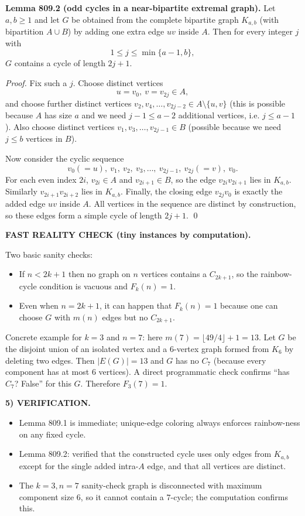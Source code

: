\textbf{Lemma 809.2 (odd cycles in a near-bipartite extremal graph).}
Let $a,b\ge 1$ and let $G$ be obtained from the complete bipartite graph $K_{a,b}$ (with bipartition $A\cup B$) by adding one extra edge $uv$ inside $A$.
Then for every integer $j$ with
\[
1\le j\le \min\{a-1,b\},
\]
$G$ contains a cycle of length $2j+1$.

\emph{Proof.}
Fix such a $j$. Choose distinct vertices
\[
 u=v_0,\ v=v_{2j}\in A,
\]
and choose further distinct vertices $v_2,v_4,\dots,v_{2j-2}\in A\setminus\{u,v\}$ (this is possible because $A$ has size $a$ and we need $j-1\le a-2$ additional vertices, i.e. $j\le a-1$).
Also choose distinct vertices $v_1,v_3,\dots,v_{2j-1}\in B$ (possible because we need $j\le b$ vertices in $B$).

Now consider the cyclic sequence
\[
 v_0(=u),\ v_1,\ v_2,\ v_3,\dots,\ v_{2j-1},\ v_{2j}(=v),\ v_0.
\]
For each even index $2i$, $v_{2i}\in A$ and $v_{2i+1}\in B$, so the edge $v_{2i}v_{2i+1}$ lies in $K_{a,b}$. Similarly $v_{2i+1}v_{2i+2}$ lies in $K_{a,b}$.
Finally, the closing edge $v_{2j}v_0$ is exactly the added edge $uv$ inside $A$.
All vertices in the sequence are distinct by construction, so these edges form a simple cycle of length $2j+1$.
\qed

\textbf{FAST REALITY CHECK (tiny instances by computation).}

Two basic sanity checks:
\begin{itemize}
\item If $n<2k+1$ then no graph on $n$ vertices contains a $C_{2k+1}$, so the rainbow-cycle condition is vacuous and $F_k(n)=1$.
\item Even when $n=2k+1$, it can happen that $F_k(n)=1$ because one can choose $G$ with $m(n)$ edges but no $C_{2k+1}$.
\end{itemize}

Concrete example for $k=3$ and $n=7$: here $m(7)=\lfloor 49/4\rfloor+1=13$.
Let $G$ be the disjoint union of an isolated vertex and a $6$-vertex graph formed from $K_6$ by deleting two edges. Then $|E(G)|=13$ and $G$ has no $C_7$ (because every component has at most $6$ vertices).
A direct programmatic check confirms ``has $C_7$? False'' for this $G$. Therefore $F_3(7)=1$.

\medskip
\noindent\textbf{5) VERIFICATION.}

\begin{itemize}
\item Lemma 809.1 is immediate; unique-edge coloring always enforces rainbow-ness on any fixed cycle.
\item Lemma 809.2: verified that the constructed cycle uses only edges from $K_{a,b}$ except for the single added intra-$A$ edge, and that all vertices are distinct.
\item The $k=3,n=7$ sanity-check graph is disconnected with maximum component size $6$, so it cannot contain a $7$-cycle; the computation confirms this.
\end{itemize}

